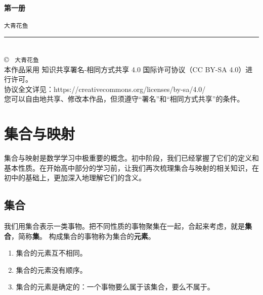\documentclass[12pt,UTF8,fontset=none]{ctexbook}
\newcommand{\mytitle}{第一册}
\newcommand{\myauthor}{大青花鱼}
\begin{document}
\cleardoublepage                %
\thispagestyle{empty}           %
\begin{center}
    \vspace*{2cm}               %
    
    { \bfseries \mytitle}
    
    \vspace{1cm}              %
    
    { \texttt{\myauthor}}
    
    \vfill                      %
    
    \rule{0.5\textwidth}{0.4pt} \\[0.5cm]
    
    {\scriptsize
    \copyright\ \the\year{} \texttt{\myauthor} \\[0.2cm]
    本作品采用 知识共享署名-相同方式共享 4.0 国际许可协议（CC BY-SA 4.0）进行许可。\\
    协议全文详见：https://creativecommons.org/licenses/by-sa/4.0/ \\
    您可以自由地共享、修改本作品，但须遵守“署名”和“相同方式共享”的条件。
    }
\end{center}
\newpage   
\tableofcontents
\newpage

\chapter{集合与映射}

集合与映射是数学学习中极重要的概念。初中阶段，我们已经掌握了它们的定义和基本性质。在开始高中部分的学习前，让我们再次梳理集合与映射的相关知识，在初中的基础上，更加深入地理解它们的含义。

\section{集合}
我们用集合表示一类事物。把不同性质的事物聚集在一起，合起来考虑，就是\textbf{集合}，简称\textbf{集}。
构成集合的事物称为集合的\textbf{元素}。
\begin{enumerate}
    \item 集合的元素互不相同。
    \item 集合的元素没有顺序。
    \item 集合的元素是确定的：一个事物要么属于该集合，要么不属于。
\end{enumerate}
\end{document}
